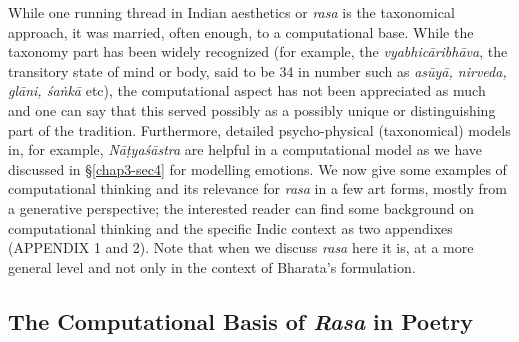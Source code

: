 While one running thread in Indian aesthetics or \textsl{rasa} is the taxonomical approach, it was married, often enough, to a computational base. While the taxonomy part has been widely recognized (for example, the \textsl{vyabhicāribhāva}, the transitory state of mind or body, said to be 34 in number such as \textsl{asūyā, nirveda, glāni, śaṅkā} etc), the computational aspect has not been appreciated as much and one can say that this served possibly as a possibly unique or distinguishing part of the tradition. Furthermore, detailed psycho-physical (taxonomical) models in, for example, \textsl{Nāṭyaśāstra} are helpful in a computational model as we have discussed in \S\ref{chap3-sec4} for modelling emotions. We now give some examples of computational thinking and its relevance for \textsl{rasa} in a few art forms, mostly from a generative perspective; the interested reader can find some background on computational thinking and the specific Indic context as two appendixes (APPENDIX 1 and 2). Note that when we discuss \textsl{rasa} here it is, at a more general level and not only in the context of Bharata’s formulation.\\[-21pt]

\subsection{The Computational Basis of \textsl{Rasa} in Poetry}\label{chap3-sec5.1}


